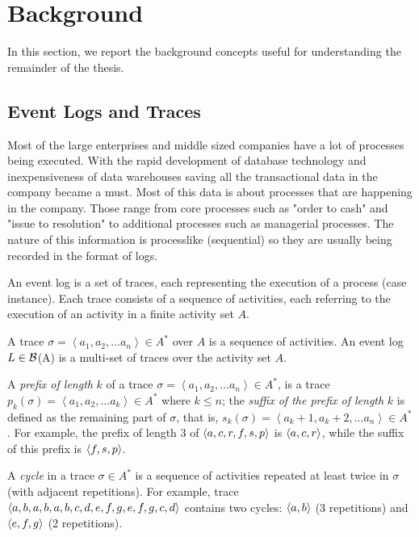

\section{Background} %
\label{sec:background}
In this section, we report the background concepts useful for understanding the remainder of the thesis.



\subsection{Event Logs and Traces} \label{logs}

Most of the large enterprises and middle sized companies have a lot of processes being executed. With the rapid development of database technology and inexpensiveness of data warehouses saving all the transactional data in the company became a must. Most of this data is about processes that are happening in the company. Those range from core processes such as "order to cash" and "issue to resolution" to additional processes such as managerial processes. The nature of this information is processlike (sequential) so they are usually being recorded in the format of logs. 

An event log is a set of traces, each representing the execution of a process (case instance). Each trace consists of a sequence of activities, each referring to the execution of an activity in a finite activity set $A$.

\begin{definition}
	A trace $\sigma=\left\langle a_1, a_2, ... a_n\right\rangle \in A^*$ over $A$ is a sequence of activities. An event log $L \in \cal{B}$(A) is a multi-set of traces over the activity set $A$.
\end{definition}

A \emph{prefix of length} $k$ of a trace $\sigma=\left\langle a_1, a_2, ... a_n\right\rangle \in A^*$, is a trace $p_k(\sigma)=\left\langle a_1, a_2, ... a_k\right\rangle \in A^*$ where $k \leq n$; the \emph{suffix of the prefix of length} $k$ is defined as the remaining part of $\sigma$, that is, $s_k(\sigma) = \left\langle a_k+1, a_k+2, ... a_n\right\rangle \in A^*$. For example, the prefix of length $3$ of $\langle a,c,r,f,s,p\rangle$ is $\langle a,c,r\rangle$, while the suffix of this prefix is $\langle f,s,p\rangle$.

A \emph{cycle} in a trace $\sigma \in A^*$ is a sequence of activities repeated at least twice in $\sigma$ (with adjacent repetitions). For example, trace $\langle a,b,a,b,a,b,c,d,e,f,g,e,f,g,c,d\rangle$ contains two cycles: $\langle a,b\rangle$ (3 repetitions) and $\langle e,f,g\rangle$ (2 repetitions).


